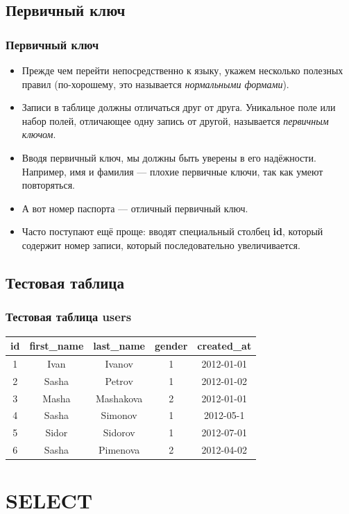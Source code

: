 \documentclass[compress,red]{beamer}
\begin{document}
\subsection{Первичный ключ}
\begin{frame}[fragile]
  \frametitle{Первичный ключ}
  \begin{itemize}
    \item Прежде чем перейти непосредственно к языку, укажем несколько полезных правил (по-хорошему, это называется \emph{нормальными формами}).
    \item Записи в таблице должны отличаться друг от друга. Уникальное поле или набор полей, отличающее одну запись от другой, называется \emph{первичным ключом}.
    \item Вводя первичный ключ, мы должны быть уверены в его надёжности. Например, имя и фамилия — плохие первичные ключи, так как умеют повторяться.
    \item А вот номер паспорта --- отличный первичный ключ.
    \item Часто поступают ещё проще: вводят специальный столбец \textbf{id}, который содержит номер записи, который последовательно увеличивается.
  \end{itemize}
\end{frame}

\subsection{Тестовая таблица}
\begin{frame}[fragile]
  \frametitle{Тестовая таблица users}
  \begin{tabular}{|c|c|c|c|c|}
  \hline
  id & first\_name & last\_name & gender & created\_at\\
  \hline
  1 & Ivan & Ivanov & 1 & 2012-01-01\\
  \hline
  2 & Sasha & Petrov & 1 & 2012-01-02\\
  \hline
  3 & Masha & Mashakova & 2 & 2012-01-01\\
  \hline
  4 & Sasha & Simonov & 1 & 2012-05-1\\
  \hline
  5 & Sidor & Sidorov & 1 & 2012-07-01\\
  \hline
  6 & Sasha & Pimenova & 2 & 2012-04-02\\
  \hline
  \end{tabular}
\end{frame}

\section{SELECT}
\end{document}
